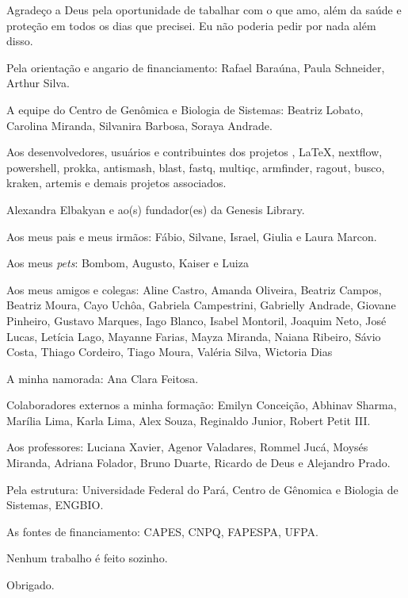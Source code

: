 \begin{agradecimentos}

Agradeço a Deus pela oportunidade de tabalhar com o que amo, além da saúde e proteção em todos os dias
que precisei. Eu não poderia pedir por nada além disso.

Pela orientação e angario de financiamento: Rafael Baraúna, Paula Schneider, Arthur Silva. 

A equipe do Centro de Genômica e Biologia de Sistemas: Beatriz Lobato, Carolina Miranda, Silvanira Barbosa,
Soraya Andrade. 

Aos desenvolvedores, usuários e contribuintes dos projetos \abnTeX, \LaTeX, nextflow, powershell, 
prokka, antismash, blast, fastq, multiqc, armfinder, ragout, busco, kraken, artemis e demais projetos
associados.

Alexandra Elbakyan e ao(s) fundador(es) da Genesis Library.

Aos meus pais e meus irmãos: Fábio, Silvane, Israel, Giulia e Laura Marcon.

Aos meus \textit{pets}: Bombom, Augusto, Kaiser e Luiza \textdagger

Aos meus amigos e colegas: Aline Castro, Amanda Oliveira, Beatriz Campos, Beatriz Moura, Cayo Uchôa, 
Gabriela Campestrini, Gabrielly Andrade, Giovane Pinheiro, Gustavo Marques, Iago Blanco, 
Isabel Montoril, Joaquim Neto, José Lucas, Letícia Lago, Mayanne Farias, Mayza Miranda, 
Naiana Ribeiro, Sávio Costa, Thiago Cordeiro, Tiago Moura, Valéria Silva, Wictoria Dias

A minha namorada: Ana Clara Feitosa.

Colaboradores externos a minha formação: Emilyn Conceição, Abhinav Sharma, Marília Lima, Karla Lima, Alex Souza, Reginaldo Junior, Robert Petit III.

Aos professores: Luciana Xavier, Agenor Valadares, Rommel Jucá, Moysés Miranda, Adriana Folador,
Bruno Duarte, Ricardo de Deus e Alejandro Prado.

Pela estrutura: Universidade Federal do Pará, Centro de Gênomica e Biologia de Sistemas, ENGBIO.

As fontes de financiamento: CAPES, CNPQ, FAPESPA, UFPA.

Nenhum trabalho é feito sozinho.

Obrigado.

\end{agradecimentos}
